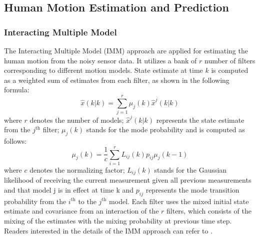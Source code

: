 \documentclass[letterpaper, 10 pt, conference]{ieeeconf}
\begin{document}
	\subsection{Human Motion Estimation and Prediction}\label{subsec:human_track}
	\subsubsection{Interacting Multiple Model}\label{subsec:imm}
	
	The Interacting Multiple Model (IMM) approach are applied for estimating the human motion from the noisy sensor data.
	It utilizes a bank of $r$ number of filters corresponding to different motion models.
	State estimate at time $k$ is computed as a weighted sum of estimates from each filter, as shown in the following formula:
	\begin{equation}
		\hat{x}(k|k)=\sum\limits_{j=1}^{r}\mu_j(k)\hat{x}^j(k|k) \label{eqn:imm_eq}
	\end{equation}
	where $r$ denotes the number of models; $\hat{x}^j(k|k)$ represents the state estimate from the $j^\text{th}$ filter; $\mu_j(k)$ stands for the mode probability and is computed as follows:
	\[
	\mu_j(k)=\frac{1}{c}\sum\limits_{i=1}^{r}L_{ij}(k)p_{ij}\mu_j(k-1)
	\]
	where $c$ denotes the normalizing factor; $L_{ij}(k)$ stands for the Gaussian likelihood of receiving the current measurement given all previous measurements and that model j is in effect at time k and $p_{ij}$ represents the mode transition probability from the $i^\text{th}$ to the $j^\text{th}$ model. 
	Each filter uses the mixed initial state estimate and covariance from an interaction of the $r$ filters, which consists of the mixing of the estimates with the mixing probability at previous time step.
	Readers interested in the details of the IMM approach can refer to \cite{yaakov2001estimation}.
	
\end{document}
